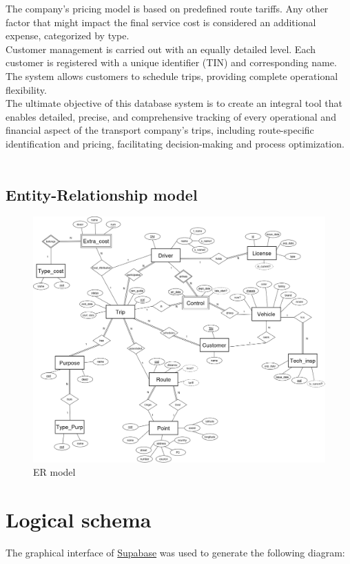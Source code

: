 \documentclass[11pt, a4paper]{article}
\begin{document}
The company's pricing model is based on predefined route tariffs. Any other factor that might impact the final service cost is considered an additional expense, categorized by type.\\

Customer management is carried out with an equally detailed level. Each customer is registered with a unique identifier (TIN) and corresponding name. The system allows customers to schedule trips, providing complete operational flexibility.\\

The ultimate objective of this database system is to create an integral tool that enables detailed, precise, and comprehensive tracking of every operational and financial aspect of the transport company's trips, including route-specific identification and pricing, facilitating decision-making and process optimization.\\\\

\newpage


\begin{landscape}

\section{Entity-Relationship model}

\begin{figure}[h!]
    \centering
    \includegraphics[width=1.03\textwidth]{img/er_model.png}
    \caption{ER model}
    \label{er_model}
\end{figure}
    

\end{landscape}


\newpage

\restoregeometry

\section{Logical schema}

The graphical interface of \href{https://www.supabase.com}{Supabase} was used to generate the following diagram:
\end{document}
